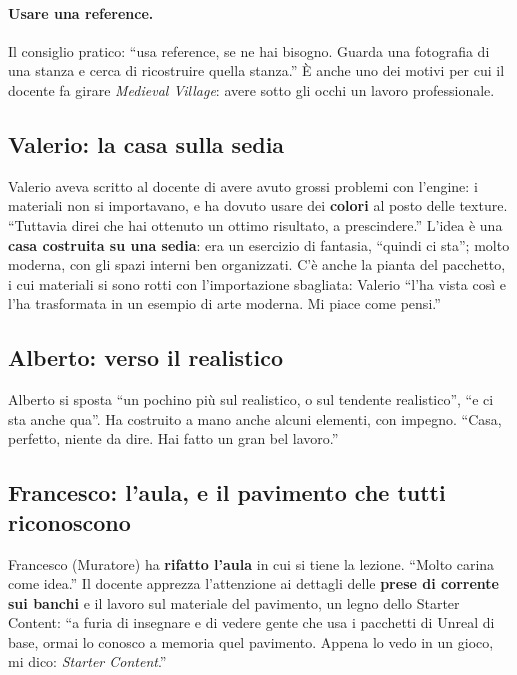 \paragraph{Usare una reference.} Il consiglio pratico: ``usa reference, se ne hai
bisogno. Guarda una fotografia di una stanza e cerca di ricostruire quella
stanza.'' È anche uno dei motivi per cui il docente fa girare \emph{Medieval
Village}: avere sotto gli occhi un lavoro professionale.

\subsection{Valerio: la casa sulla sedia}

Valerio aveva scritto al docente di avere avuto grossi problemi con l'engine: i
materiali non si importavano, e ha dovuto usare dei \textbf{colori} al posto delle
texture. ``Tuttavia direi che hai ottenuto un ottimo risultato, a prescindere.''
L'idea è una \textbf{casa costruita su una sedia}: era un esercizio di fantasia,
``quindi ci sta''; molto moderna, con gli spazi interni ben organizzati. C'è
anche la pianta del pacchetto, i cui materiali si sono rotti con l'importazione
sbagliata: Valerio ``l'ha vista così e l'ha trasformata in un esempio di arte
moderna. Mi piace come pensi.''

\subsection{Alberto: verso il realistico}

Alberto si sposta ``un pochino più sul realistico, o sul tendente realistico'',
``e ci sta anche qua''. Ha costruito a mano anche alcuni elementi, con
impegno. ``Casa, perfetto, niente da dire. Hai fatto un gran bel lavoro.''

\subsection{Francesco: l'aula, e il pavimento che tutti riconoscono}

Francesco (Muratore) ha \textbf{rifatto l'aula} in cui si tiene la lezione. ``Molto
carina come idea.'' Il docente apprezza l'attenzione ai dettagli delle
\textbf{prese di corrente sui banchi} e il lavoro sul materiale del pavimento, un
legno dello Starter Content: ``a furia di insegnare e di vedere gente che usa i
pacchetti di Unreal di base, ormai lo conosco a memoria quel pavimento. Appena lo
vedo in un gioco, mi dico: \emph{Starter Content}.''

